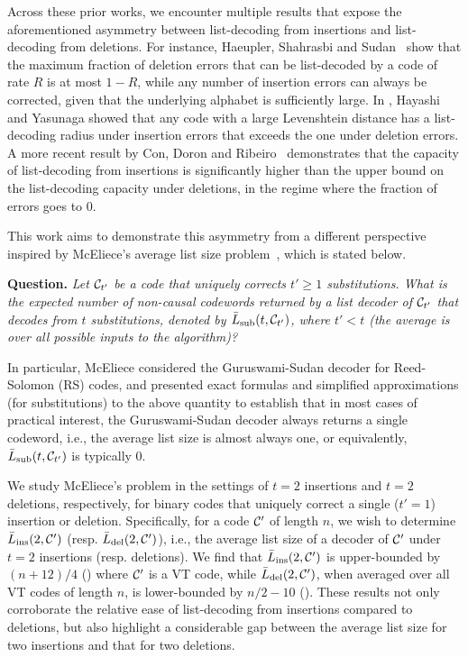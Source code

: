 \documentclass[conference, a4paper]{IEEEtran}
\begin{document}
Across these prior works, we encounter multiple results that expose the aforementioned asymmetry between list-decoding from insertions and list-decoding from deletions. For instance, Haeupler, Shahrasbi and Sudan~\cite[Theorem 1.3]{haeupler2018synchronization} show that the maximum fraction of deletion errors that can be list-decoded by a code of rate $R$ is at most $1-R$, while any number of insertion errors can always be corrected, given that the underlying alphabet is sufficiently large. 
In \cite{hayashiListDecodabilityInsertions2020}, Hayashi and Yasunaga showed that any code with a large Levenshtein distance has a list-decoding radius under insertion errors that exceeds the one under deletion errors. 
A more recent result by Con, Doron and Ribeiro~\cite{conInsertionListDecodingCapacity2026} demonstrates that the capacity of list-decoding from insertions is significantly higher than the upper bound on the list-decoding capacity under deletions, in the regime where the fraction of errors goes to $0$.

This work aims to demonstrate this asymmetry from a different perspective inspired by McEliece's average list size problem~\cite{mcelieceAverageListSize2003}, which is stated below.

\textbf{Question.} \textit{Let $\mathcal{C}_{t'}$ be a code that uniquely corrects $t' \geq 1$ substitutions. What is the expected number of non-causal codewords returned by a list decoder of $\mathcal{C}_{t'}$ that decodes from $t$ substitutions, denoted by $\bar{L}_\mathrm{sub}(t,\mathcal{C}_{t'})$, where $t' < t$ (the average is over all possible inputs to the algorithm)?
}

In particular, McEliece considered the Guruswami-Sudan decoder for Reed-Solomon (RS) codes, and presented exact formulas and simplified approximations (for substitutions) to the above quantity to establish that in most cases of practical interest, the Guruswami-Sudan decoder always returns a single codeword, i.e., the average list size is almost always one, or equivalently, $\bar{L}_\mathrm{sub}(t,\mathcal{C}_{t'})$ is typically $0$. 

We study McEliece's problem in the settings of $t=2$ insertions and $t=2$ deletions, respectively, for binary codes that uniquely correct a single ($t'=1$) insertion or deletion. 
Specifically, for a code $\mathcal{C}'$ of length $n$, we wish to determine $\bar{L}_\mathrm{ins}(2,\mathcal{C}')$ (resp. $\bar{L}_\mathrm{del}(2,\mathcal{C}')$), i.e., the average list size of a decoder of $\mathcal{C}'$ under $t=2$ insertions (resp. deletions). We find that $\bar{L}_\mathrm{ins}(2,\mathcal{C}')$ is upper-bounded by $(n+12)/4$ () where $\mathcal{C}'$ is a VT code, while $\bar{L}_\mathrm{del}(2,\mathcal{C}')$, when averaged over all VT codes of length $n$, is lower-bounded by $n/2-10$ (). These results not only corroborate the relative ease of list-decoding from insertions compared to deletions, but also highlight a considerable gap between the average list size for two insertions and that for two deletions.
\end{document}
